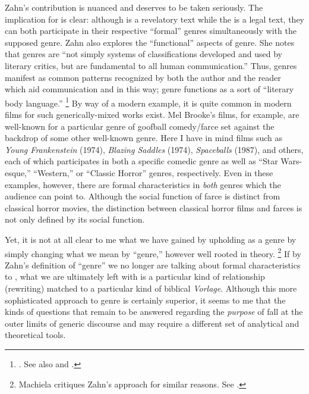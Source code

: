 Zahn's contribution is nuanced and deserves to be taken seriously. The implication for \rwb is clear: although \jub is a revelatory text while the \templescroll is a legal text, they can both participate in their respective ``formal'' genres simultaneously with the supposed \rwb genre. Zahn also explores the ``functional'' aspects of genre. She notes that genres are ``not simply systems of classifications developed and used by literary critics, but are fundamental to all human communication.''%
    \autocite[280]{zahn_jbl2012}
Thus, genres manifest as common patterns recognized by both the author and the reader which aid communication and in this way; genre functions as a sort of ``literary body language.''%
    \footnote{%
        \cite[276]{zahn_jbl2012}. See also 
        \cite[199]{newsom_grossman2010} and 
        \cite[37-53]{fowler2002}.}
By way of a modern example, it is quite common in modern films for such generically-mixed works exist. Mel Brooke's films, for example, are well-known for a particular genre of goofball comedy/farce set against the backdrop of some other well-known genre. Here I have in mind films such as \emph{Young Frankenstein} (1974), \emph{Blazing Saddles} (1974), \emph{Spaceballs} (1987), and others, each of which participates in both a specific comedic genre as well as ``Star Wars-esque,'' ``Western,'' or ``Classic Horror'' genres, respectively. Even in these examples, however, there are formal characteristics in \emph{both} genres which the audience can point to. Although the social function of farce is distinct from classical horror movies, the distinction between classical horror films and farces is not only defined by its social function. 

Yet, it is not at all clear to me what we have gained by upholding \rwb as a genre by simply changing what we mean by ``genre,'' however well rooted in theory.%
    \footnote{Machiela critiques Zahn's approach for similar reasons. See \cite{machiela_jjs2010}.}
If by Zahn's definition of ``genre'' we no longer are talking about formal characteristics to \rwb, what we are ultimately left with is a particular kind of relationship (rewriting) matched to a particular kind of biblical \emph{Vorlage}. Although this more sophisticated approach to genre is certainly superior, it seems to me that the kinds of questions that remain to be answered regarding the \emph{purpose} of \rwb fall at the outer limits of generic discourse and may require a different set of analytical and theoretical tools.



